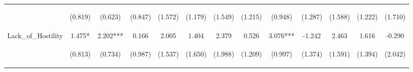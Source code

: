 \begin{tabular}{lcccccccccccc}
 & \begin{footnotesize}(0.819)\end{footnotesize} & \begin{footnotesize}(0.623)\end{footnotesize} & \begin{footnotesize}(0.847)\end{footnotesize} & \begin{footnotesize}(1.572)\end{footnotesize} & \begin{footnotesize}(1.179)\end{footnotesize} & \begin{footnotesize}(1.549)\end{footnotesize} & \begin{footnotesize}(1.215)\end{footnotesize} & \begin{footnotesize}(0.948)\end{footnotesize} & \begin{footnotesize}(1.287)\end{footnotesize} & \begin{footnotesize}(1.588)\end{footnotesize} & \begin{footnotesize}(1.222)\end{footnotesize} & \begin{footnotesize}(1.710)\end{footnotesize}\\
\noalign{\smallskip}Lack_of_Hostility & 1.475* & 2.202*** & 0.166 & 2.005 & 1.404 & 2.379 & 0.526 & 3.076*** & -1.242 & 2.463 & 1.616 & -0.290\\
 & \begin{footnotesize}(0.813)\end{footnotesize} & \begin{footnotesize}(0.734)\end{footnotesize} & \begin{footnotesize}(0.987)\end{footnotesize} & \begin{footnotesize}(1.537)\end{footnotesize} & \begin{footnotesize}(1.650)\end{footnotesize} & \begin{footnotesize}(1.988)\end{footnotesize} & \begin{footnotesize}(1.209)\end{footnotesize} & \begin{footnotesize}(0.997)\end{footnotesize} & \begin{footnotesize}(1.374)\end{footnotesize} & \begin{footnotesize}(1.591)\end{footnotesize} & \begin{footnotesize}(1.394)\end{footnotesize} & \begin{footnotesize}(2.042)\end{footnotesize}\\

\end{tabular}

